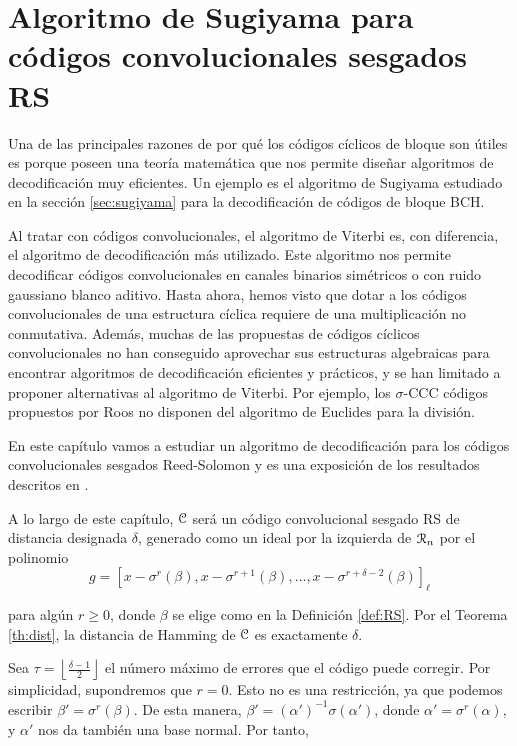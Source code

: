 

\chapter{Algoritmo de Sugiyama para códigos convolucionales sesgados RS}\label{ch:quinto-capitulo}

Una de las principales razones de por qué los códigos cíclicos de bloque son útiles es porque poseen una teoría matemática que nos permite diseñar algoritmos de decodificación muy eficientes. Un ejemplo es el algoritmo de Sugiyama estudiado en la sección \ref{sec:sugiyama} para la decodificación de códigos de bloque BCH.

Al tratar con códigos convolucionales, el algoritmo de Viterbi es, con diferencia, el algoritmo de decodificación más utilizado. Este algoritmo nos permite decodificar códigos convolucionales en canales binarios simétricos o con ruido gaussiano blanco aditivo. Hasta ahora, hemos visto que dotar a los códigos convolucionales de una estructura cíclica requiere de una multiplicación no conmutativa. Además, muchas de las propuestas de códigos cíclicos convolucionales no han conseguido aprovechar sus estructuras algebraicas para encontrar algoritmos de decodificación eficientes y prácticos, y se han limitado a proponer alternativas al algoritmo de Viterbi. Por ejemplo, los $\sigma$-CCC códigos propuestos por Roos \cite{Roos} no disponen del algoritmo de Euclides para la división.

En este capítulo vamos a estudiar un algoritmo de decodificación para los códigos convolucionales sesgados Reed-Solomon y es una exposición de los resultados descritos en \cite{gomez2017sugiyama}.

A lo largo de este capítulo, $\mathcal C$ será un código convolucional sesgado RS de distancia designada $\delta$, generado como un ideal por la izquierda de $\mathcal R_n$ por el polinomio 
$$ g = \left[x - \sigma^r(\beta),x - \sigma^{r+1}(\beta),\dots,x - \sigma^{r + \delta - 2}(\beta)\right]_\ell$$

para algún $r \geq 0$, donde $\beta$ se elige como en la Definición \ref{def:RS}. Por el Teorema \ref{th:dist}, la distancia de Hamming de $\mathcal C$ es exactamente $\delta$.

Sea $\tau = \left\lfloor \frac{\delta - 1}{2} \right\rfloor $ el número máximo de errores que el código puede corregir. Por simplicidad, supondremos que $r = 0$. Esto no es una restricción, ya que podemos escribir $\beta' = \sigma^{r}(\beta)$. De esta manera, $\beta' = (\alpha')^{-1}\sigma(\alpha')$, donde $\alpha' = \sigma^{r}(\alpha)$, y $\alpha'$ nos da también una base normal. Por tanto, 

